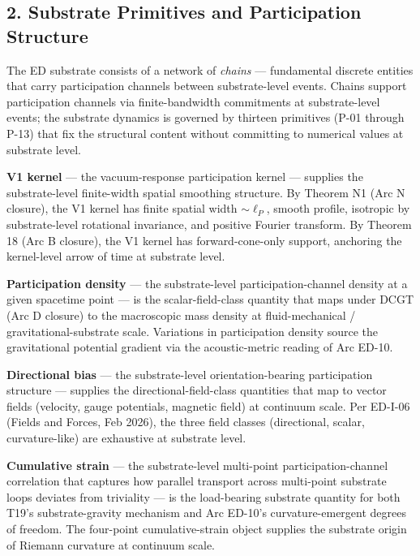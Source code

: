 \documentclass[
  11pt,a4paper]{article}
\begin{document}
\subsection{2. Substrate Primitives and Participation
Structure}\label{substrate-primitives-and-participation-structure}

The ED substrate consists of a network of \emph{chains} --- fundamental
discrete entities that carry participation channels between
substrate-level events. Chains support participation channels via
finite-bandwidth commitments at substrate-level events; the substrate
dynamics is governed by thirteen primitives (P-01 through P-13) that fix
the structural content without committing to numerical values at
substrate level.

\textbf{V1 kernel} --- the vacuum-response participation kernel ---
supplies the substrate-level finite-width spatial smoothing structure.
By Theorem N1 (Arc N closure), the V1 kernel has finite spatial width
\(\sim\ell_P\), smooth profile, isotropic by substrate-level rotational
invariance, and positive Fourier transform. By Theorem 18 (Arc B
closure), the V1 kernel has forward-cone-only support, anchoring the
kernel-level arrow of time at substrate level.

\textbf{Participation density} --- the substrate-level
participation-channel density at a given spacetime point --- is the
scalar-field-class quantity that maps under DCGT (Arc D closure) to the
macroscopic mass density at fluid-mechanical / gravitational-substrate
scale. Variations in participation density source the gravitational
potential gradient via the acoustic-metric reading of Arc ED-10.

\textbf{Directional bias} --- the substrate-level orientation-bearing
participation structure --- supplies the directional-field-class
quantities that map to vector fields (velocity, gauge potentials,
magnetic field) at continuum scale. Per ED-I-06 (Fields and Forces, Feb
2026), the three field classes (directional, scalar, curvature-like) are
exhaustive at substrate level.

\textbf{Cumulative strain} --- the substrate-level multi-point
participation-channel correlation that captures how parallel transport
across multi-point substrate loops deviates from triviality --- is the
load-bearing substrate quantity for both T19's substrate-gravity
mechanism and Arc ED-10's curvature-emergent degrees of freedom. The
four-point cumulative-strain object supplies the substrate origin of
Riemann curvature at continuum scale.
\end{document}
